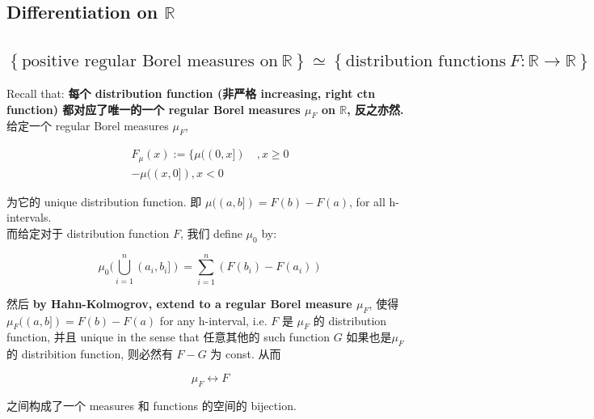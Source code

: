 \subsection{\texorpdfstring{Differentiation on \(\mathbb{R}\)}{Differentiation on \textbackslash mathbb\{R\}}}\label{differentiation-on-mathbbr}

\subsection{\texorpdfstring{\(\left\{ {\text{positive regular Borel measures on}\ \mathbb{R}} \right\} \simeq \left\{ {\text{distribution functions}\ F:\mathbb{R}\rightarrow\mathbb{R}} \right\}\)}{\textbackslash left\textbackslash\{ \{\textbackslash text\{positive regular Borel measures on\}\textbackslash{} \textbackslash mathbb\{R\}\} \textbackslash right\textbackslash\} \textbackslash simeq \textbackslash left\textbackslash\{ \{\textbackslash text\{distribution functions\}\textbackslash{} F:\textbackslash mathbb\{R\}\textbackslash rightarrow\textbackslash mathbb\{R\}\} \textbackslash right\textbackslash\}}}

Recall that: \textbf{每个 distribution function (非严格 increasing, right ctn function) 都对应了唯一的一个 regular Borel measures \(\mu_{F}\) on \(\mathbb{R}\), 反之亦然.}\\
给定一个 regular Borel measures \(\mu_{F}\),

\[\begin{matrix}
{F_{\mu}(x) := \{\mu((0,x\rbrack)\quad,x \geq 0} \\
{- \mu((x,0\rbrack),x < 0}
\end{matrix}\]

为它的 unique distribution function. 即 \(\mu((a,b\rbrack) = F(b) - F(a)\), for all h-intervals.\\
而给定对于 distribution function \(F\), 我们 define \(\mu_{0}\) by:

\[\mu_{0}(\bigcup\limits_{i = 1}^{n}(a_{i},b_{i}\rbrack) = \sum\limits_{i = 1}^{n}(F(b_{i}) - F(a_{i}))\]

然后 \textbf{by Hahn-Kolmogrov, extend to a regular Borel measure \(\mu_{F}\)}, 使得 \(\mu_{F}((a,b\rbrack) = F(b) - F(a)\) for any h-interval, i.e. \(F\) 是 \(\mu_{F}\) 的 distribution function, 并且 unique in the sense that 任意其他的 such function \(G\) 如果也是\(\mu_{F}\) 的 distribition function, 则必然有 \(F - G\) 为 const. 从而

\[\mu_{F}\operatorname{\leftrightarrow }F\]

之间构成了一个 measures 和 functions 的空间的 bijection.


